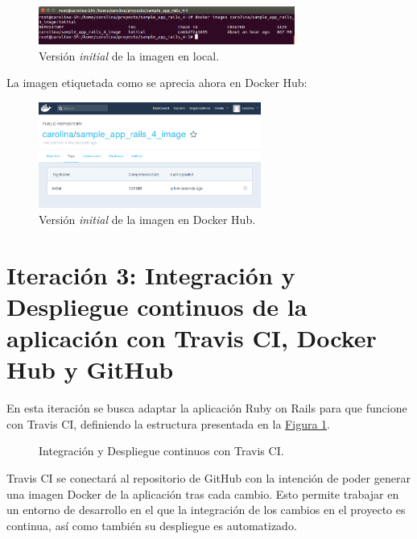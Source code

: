 \begin{figure}[H]
\centering
\includegraphics[width=0.75\textwidth]{images/figures/dockerimages3.png}
\caption{Versión \textit{initial} de la imagen  en local.}
\end{figure}

La imagen etiquetada como  se aprecia ahora en Docker Hub:

\begin{figure}[H]
\centering
\includegraphics[width=0.65\textwidth]{images/figures/dockerhubinitial.png}
\caption{Versión \textit{initial} de la imagen  en Docker Hub.}
\end{figure}

\section[Iteración 3: Integración y Despliegue continuos]{Iteración 3: Integración y Despliegue continuos de la aplicación con Travis CI, Docker Hub y GitHub}

En esta iteración se busca adaptar la aplicación Ruby on Rails para que funcione con Travis CI, definiendo la estructura presentada en la \hyperref[fig:iteration2]{Figura \ref{fig:iteration2}}. 

\begin{figure}[H]
\caption{Integración y Despliegue continuos con Travis CI. \label{fig:iteration2}}
\end{figure}

Travis CI se conectará al repositorio de GitHub  con la intención de poder generar una imagen Docker de la aplicación tras cada cambio. Esto permite trabajar en un entorno de desarrollo en el que la integración de los cambios en el proyecto es continua, así como también su despliegue es automatizado.

